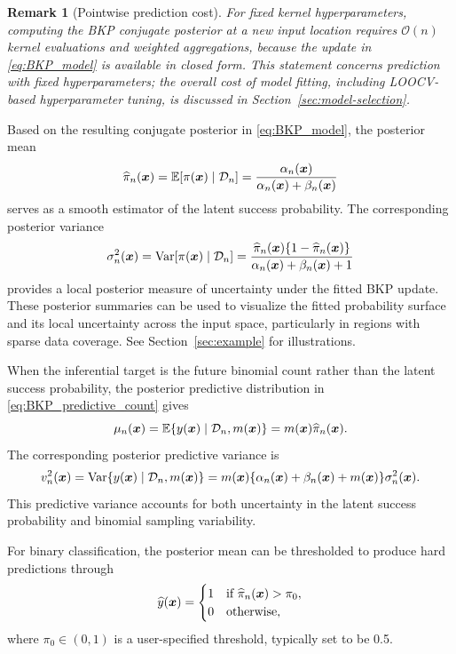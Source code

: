 \documentclass[article, shortnames]{jss}
\newtheorem{remark}{Remark}
\renewcommand{\vec}[1]{\mbox{\boldmath ${#1}$}}
\begin{document}
\begin{remark}[Pointwise prediction cost]
	For fixed kernel hyperparameters, computing the BKP conjugate posterior at a new input location requires $\mathcal{O}(n)$ kernel evaluations and weighted aggregations, because the update in \eqref{eq:BKP_model} is available in closed form. 
	This statement concerns prediction with fixed hyperparameters; the overall cost of model fitting, including LOOCV-based hyperparameter tuning, is discussed in Section~\ref{sec:model-selection}.
\end{remark}

Based on the resulting conjugate posterior in \eqref{eq:BKP_model}, the posterior mean
\begin{equation}\label{eq:BKPmean}
	\widehat{\pi}_n(\vec{x}) = \mathbb{E}[\pi(\vec{x}) \mid \mathcal{D}_n] = \frac{\alpha_n(\vec{x})}{\alpha_n(\vec{x}) + \beta_n(\vec{x})}
\end{equation}
serves as a smooth estimator of the latent success probability. The corresponding posterior variance  
\begin{equation}\label{eq:BKPvar}
	\sigma^2_n(\vec{x})=\mathrm{Var}[\pi(\vec{x}) \mid \mathcal{D}_n] = \frac{\widehat{\pi}_n(\vec{x})\{1 - \widehat{\pi}_n(\vec{x})\}}{\alpha_n(\vec{x}) + \beta_n(\vec{x}) + 1}
\end{equation}
provides a local posterior measure of uncertainty under the fitted BKP update.
These posterior summaries can be used to visualize the fitted probability surface and its local uncertainty across the input space, particularly in regions with sparse data coverage. See Section~\ref{sec:example} for illustrations.

When the inferential target is the future binomial count rather than the
latent success probability, the posterior predictive distribution in
\eqref{eq:BKP_predictive_count} gives
\[
	\mu_n(\vec{x})	 = \mathbb{E}\{y(\vec{x}) \mid \mathcal{D}_n, m(\vec{x})\} = m(\vec{x})\widehat{\pi}_n(\vec{x}).
\]
The corresponding posterior predictive variance is
\[
	v^2_n(\vec{x}) = \mathrm{Var}\{y(\vec{x}) \mid \mathcal{D}_n, m(\vec{x})\} = m(\vec{x})	\{\alpha_n(\vec{x})+\beta_n(\vec{x})+m(\vec{x})\}\sigma^2_n(\vec{x}).
\]
This predictive variance accounts for both uncertainty in the latent success
probability and binomial sampling variability.

For binary classification, the posterior mean can be thresholded to produce hard predictions through
\begin{equation}\label{eq:class_cri}
	\widehat{y}(\vec{x}) =
	\begin{cases}
		1 & \text{if } \widehat{\pi}_n(\vec{x}) > \pi_0, \\
		0 & \text{otherwise},
	\end{cases}
\end{equation}
where $\pi_0 \in (0,1)$ is a user-specified threshold, typically set to be 0.5.
\end{document}
